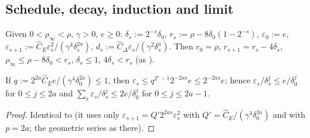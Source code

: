 \subsection{Schedule, decay, induction and limit}\label{bpI:p2:sec-iteration}

\begin{definition}[Schedule]\label{bpI:p2:schedule}
Given $0<\rho_\infty<\rho$, $\gamma>0$, $e\ge0$: $\delta_s:=2^{-s}\delta_0$, $r_s:=\rho-8\delta_0(1-2^{-s})$, $\varepsilon_0:=e$,
$\varepsilon_{s+1}:=\hat C_E\varepsilon_s^2/(\gamma^4\delta_s^{2a})$, $d_s:=\hat C_\Delta\varepsilon_s/(\gamma^2\delta_s^a)$. Then $r_0=\rho$, $r_{s+1}=r_s-4\delta_s$, $\rho_\infty\le\rho-8\delta_0<r_s$, $\delta_s\le1$, $4\delta_s<r_s$ (as ).
\end{definition}

\begin{lemma}[Decay]\label{bpI:p2:error-decay}
If $q:=2^{2a}\hat C_Ee/(\gamma^4\delta_0^{2a})\le1$, then $\varepsilon_s\le q^{2^s-1}2^{-2as}e\le2^{-2as}e$; hence $\varepsilon_s/\delta_s^j\le e/\delta_0^j$ for $0\le j\le2a$ and $\sum_s\varepsilon_s/\delta_s^j\le2e/\delta_0^j$ for $0\le j\le2a-1$.
\end{lemma}
\begin{proof}
Identical to  (it uses only $\varepsilon_{s+1}=Q'2^{2as}\varepsilon_s^2$ with $Q'=\hat C_E/(\gamma^4\delta_0^{2a})$ and  with $p=2a$; the geometric series as there).
\end{proof}

